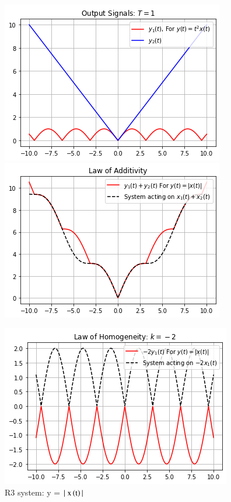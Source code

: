 \documentclass[journal,12pt,twocolumn]{IEEEtran}
\begin{document}
\begin{figure}[h]
\caption{R3 system: y = $|\;\text{x}\left(\text{t}\right)|$}
\includegraphics[width = \columnwidth]{y3}
\includegraphics[width = \columnwidth]{y3_p}

\includegraphics[width = \columnwidth]{y3_h}


\end{figure}
\end{document}
